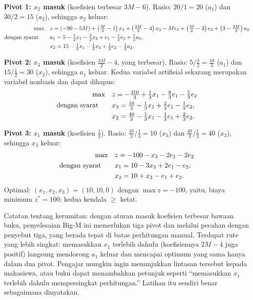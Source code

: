 \textbf{Pivot 1: $x_2$ masuk} (koefisien terbesar $3M - 6$). Rasio:
$20/1 = 20$ ($a_1$) dan $30/2 = 15$ ($a_2$), sehingga $a_2$ keluar:
\[
\begin{aligned}
\max\quad & z = (-90 - 5M) + \left(\tfrac{M}{2} - 1\right)x_1
  + \left(\tfrac{3M}{2} - 4\right)x_3 - M e_1
  + \left(\tfrac{M}{2} - 3\right)e_2 + \left(3 - \tfrac{3M}{2}\right)a_2 \\
\mbox{dengan syarat}\quad\quad & a_1 = 5 - \tfrac12 x_1 - \tfrac32 x_3 + e_1 - \tfrac12 e_2 + \tfrac12 a_2, \\
& x_2 = 15 - \tfrac12 x_1 - \tfrac12 x_3 + \tfrac12 e_2 - \tfrac12 a_2.
\end{aligned}
\]

\textbf{Pivot 2: $x_3$ masuk} (koefisien $\tfrac{3M}{2} - 4$, yang
terbesar). Rasio: $5/\tfrac32 = \tfrac{10}{3}$ ($a_1$) dan
$15/\tfrac12 = 30$ ($x_2$), sehingga $a_1$ keluar. Kedua variabel artifisial sekarang
merupakan variabel nonbasis dan dapat dihapus:
\[
\begin{aligned}
\max\quad & z = -\tfrac{310}{3} + \tfrac13 x_1 - \tfrac83 e_1 - \tfrac53 e_2 \\
\mbox{dengan syarat}\quad\quad & x_3 = \tfrac{10}{3} - \tfrac13 x_1 + \tfrac23 e_1 - \tfrac13 e_2, \\
& x_2 = \tfrac{40}{3} - \tfrac13 x_1 - \tfrac13 e_1 + \tfrac23 e_2.
\end{aligned}
\]

\textbf{Pivot 3: $x_1$ masuk} (koefisien $\tfrac13$). Rasio:
$\tfrac{10}{3}/\tfrac13 = 10$ ($x_3$) dan $\tfrac{40}{3}/\tfrac13 = 40$
($x_2$), sehingga $x_3$ keluar:
\[
\begin{aligned}
\max\quad & z = -100 - x_3 - 2e_1 - 2e_2 \\
\mbox{dengan syarat}\quad\quad & x_1 = 10 - 3x_3 + 2e_1 - e_2, \\
& x_2 = 10 + x_3 - e_1 + e_2.
\end{aligned}
\]
Optimal: $(x_1, x_2, x_3) = (10, 10, 0)$ dengan $\max z = -100$, yaitu,
biaya minimum $z^* = 100$; kedua kendala $\geq$ ketat.

\begin{qaflag}
Catatan tentang kerumitan: dengan aturan masuk koefisien terbesar bawaan buku,
penyelesaian Big-M ini memerlukan tiga pivot dan melalui pecahan dengan penyebut tiga,
yang berada tepat di batas perhitungan manual. Terdapat rute yang lebih singkat:
memasukkan $x_1$ terlebih dahulu (koefisiennya $2M - 4$ juga positif) langsung mendorong
$a_1$ keluar dan mencapai optimum yang sama hanya dalam dua pivot.
Pengajar mungkin ingin menunjukkan lintasan tersebut kepada mahasiswa, atau buku dapat
menambahkan petunjuk seperti ``memasukkan $x_1$ terlebih dahulu mempersingkat perhitungan.''
Latihan itu sendiri benar sebagaimana dinyatakan.
\end{qaflag}

